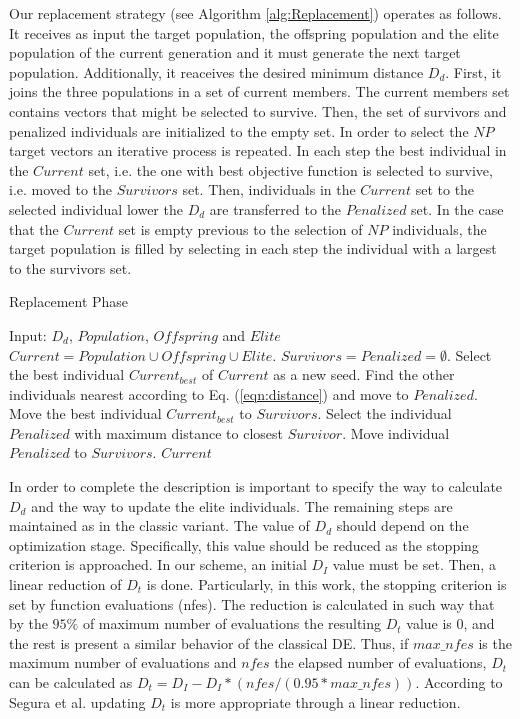 Our replacement strategy (see Algorithm \ref{alg:Replacement}) operates as follows.
%
It receives as input the target population, the offspring population and the elite population of the current generation and
it must generate the next target population.
%
Additionally, it reaceives the desired minimum distance $D_d$.
%
First, it joins the three populations in a set of current members.
%
The current members set contains vectors that might be selected to survive.
%
Then, the set of survivors and penalized individuals are initialized to the empty set.
%
In order to select the $NP$ target vectors an iterative process is repeated.
%
In each step the best individual in the $Current$ set, i.e. the one with best objective function is selected
to survive, i.e. moved to the $Survivors$ set.
%
Then, individuals in the $Current$ set to the selected individual lower the $D_d$ are transferred to the
$Penalized$ set.
%
In the case that the $Current$ set is empty previous to the selection of $NP$ individuals, the target
population is filled by selecting in each step the individual with a largest \DCN{} to the survivors set.


\begin{algorithm}[H]
  \scriptsize
	\caption{Replacement Phase} \label{alg:Replacement}
	\begin{algorithmic}[1]
	\STATE Input: $D_d$, $Population$, $Offspring$ and $Elite$
	\STATE $Current = Population \cup Offspring \cup Elite$.
	\STATE $Survivors = Penalized = \emptyset$.
	   \STATE Select the best individual $Current_{best}$ of $Current$ as a new seed.
	   \STATE Find the other individuals nearest according to Eq. (\ref{eqn:distance}) and move to $Penalized$.
	   \STATE Move the best individual $Current_{best}$ to $Survivors$.
	\ENDWHILE
	   \STATE Select the individual $Penalized$ with maximum distance to closest $Survivor$.
	   \STATE Move individual $Penalized$ to $Survivors$.
	\ENDWHILE
       \RETURN $Current$
\end{algorithmic}
\end{algorithm}


In order to complete the description is important to specify the way to calculate $D_d$ and the way to update the 
elite individuals.
%
The remaining steps are maintained as in the classic \DE{} variant.
%
The value of $D_d$ should depend on the optimization stage.
%
Specifically, this value should be reduced as the stopping criterion is approached.
%
In our scheme, an initial $D_I$ value must be set.
%
Then, a linear reduction of $D_t$ is done.
%
Particularly, in this work, the stopping criterion is set by function evaluations (nfes).
%
The reduction is calculated in such way that by the $95\%$ of maximum number of evaluations the resulting $D_t$ value is $0$, and the rest is present a similar behavior of the classical DE.
%
Thus, if $max\_nfes$ is the maximum number of evaluations and $nfes$ the elapsed number of evaluations, $D_t$ can be calculated as $D_t=D_I - D_I *(nfes/(0.95*max\_nfes))$.
%
According to Segura et al. \cite{segura2016novel} updating $D_t$ is more appropriate through a linear reduction.
%


